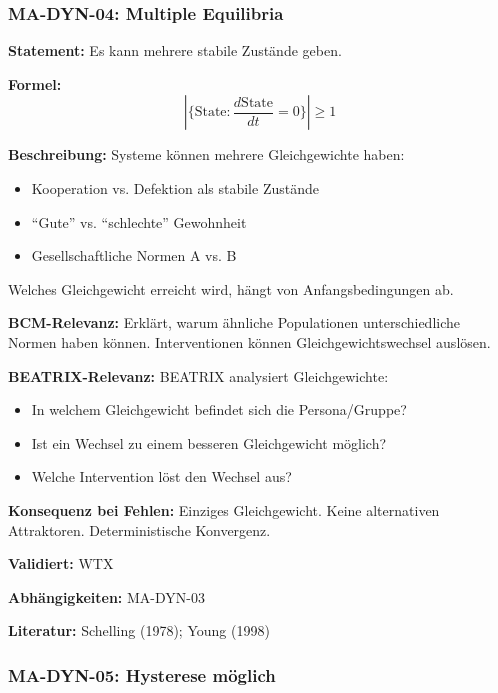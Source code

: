 \subsubsection*{MA-DYN-04: Multiple Equilibria}

\textbf{Statement:} Es kann mehrere stabile Zustände geben.

\textbf{Formel:}
\begin{equation}
|\{\text{State}: \frac{d\text{State}}{dt} = 0\}| \geq 1
\end{equation}

\textbf{Beschreibung:}
Systeme können mehrere Gleichgewichte haben:
\begin{itemize}
    \item Kooperation vs. Defektion als stabile Zustände
    \item ``Gute'' vs. ``schlechte'' Gewohnheit
    \item Gesellschaftliche Normen A vs. B
\end{itemize}
Welches Gleichgewicht erreicht wird, hängt von Anfangsbedingungen ab.

\textbf{BCM-Relevanz:}
Erklärt, warum ähnliche Populationen unterschiedliche Normen haben können. Interventionen können Gleichgewichtswechsel auslösen.

\textbf{BEATRIX-Relevanz:}
BEATRIX analysiert Gleichgewichte:
\begin{itemize}
    \item In welchem Gleichgewicht befindet sich die Persona/Gruppe?
    \item Ist ein Wechsel zu einem besseren Gleichgewicht möglich?
    \item Welche Intervention löst den Wechsel aus?
\end{itemize}

\textbf{Konsequenz bei Fehlen:}
Einziges Gleichgewicht. Keine alternativen Attraktoren. Deterministische Konvergenz.

\textbf{Validiert:} WTX

\textbf{Abhängigkeiten:} MA-DYN-03

\textbf{Literatur:} Schelling (1978); Young (1998)


\subsubsection*{MA-DYN-05: Hysterese möglich}

